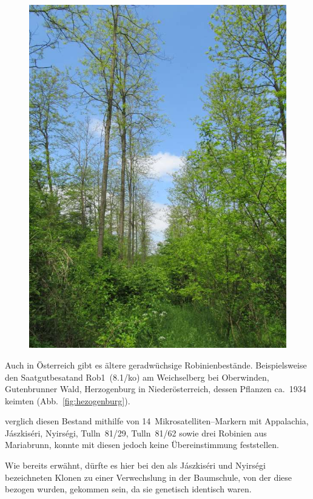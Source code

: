 \documentclass[twocolumn]{scrartcl}
\begin{document}
\begin{figure}[htbp]
  \centering
  \includegraphics[width=.9\linewidth]{./bild/GlasweinRobinie2023b}
  \label{fig:glaswein2}
\end{figure}

Auch in Österreich gibt es ältere geradwüchsige Robinienbestände.
Beispielsweise den Saatgutbesatand Rob1~(8.1/ko) am Weichselberg bei
Oberwinden, Gutenbrunner Wald, Herzogenburg in Niederösterreich,
dessen Pflanzen ca.\ 1934 keimten (Abb.~\ref{fig:hezogenburg}).

\citet{heinze2014robinie} verglich diesen Bestand mithilfe von
14~Mikrosatelliten--Markern mit Appalachia, Jászkiséri, Nyirségi,
Tulln~81/29, Tulln~81/62 sowie drei Robinien aus Mariabrunn, konnte
mit diesen jedoch keine Übereinstimmung feststellen.

Wie bereits erwähnt, dürfte
es hier bei den als Jászkiséri und Nyirségi bezeichneten Klonen zu
einer Verwechslung in der Baumschule, von der diese bezogen wurden,
gekommen sein, da sie genetisch identisch waren.
\end{document}
